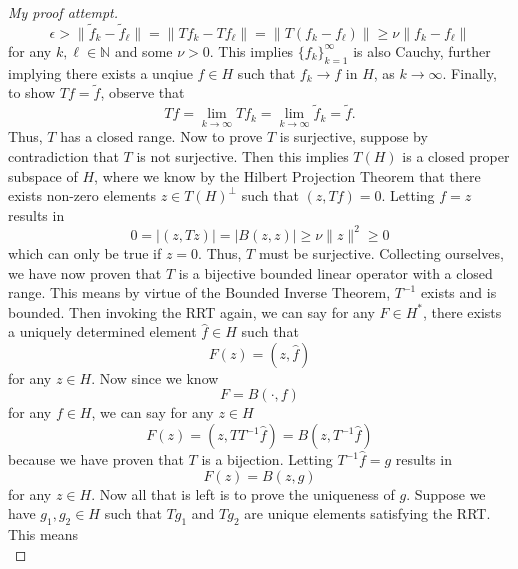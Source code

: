 \documentclass[11pt]{article}
\theoremstyle{definition}
\begin{document}
\begin{proof}[My proof attempt]
	\begin{equation*}
		\epsilon > \|\tilde{f}_k - \tilde{f}_{\ell}\| = \|Tf_k - Tf_{\ell}\| = \|T(f_k - f_{\ell})\| \geq \nu \|f_k - f_{\ell}\|
	\end{equation*}
	for any $k,\ell \in \mathbb{N}$ and some $\nu >0$.
	This implies $\{f_k\}_{k=1}^{\infty}$ is also Cauchy, further implying there exists a unqiue $f \in H$ such that
	$f_k \rightarrow f$ in $H$, as $k \rightarrow \infty$.
	Finally, to show $Tf = \tilde{f}$, observe that
	\begin{equation*}
		Tf = \lim_{k\rightarrow \infty}{Tf_k} = \lim_{k\rightarrow \infty}{\tilde{f}_k} = \tilde{f}.
	\end{equation*}
	Thus, $T$ has a closed range. Now to prove $T$ is surjective, suppose by contradiction that $T$ is not surjective.
	Then this implies $T(H)$ is a closed proper subspace of $H$, where we know by the Hilbert Projection Theorem that
	there exists non-zero elements $z \in T(H)^{\bot}$ such that $(z,Tf) = 0$. Letting $f = z$ results in
	\begin{equation*}
		0 = |(z,Tz)| = |B(z,z)| \geq \nu \|z\|^2 \geq 0
	\end{equation*}
	which can only be true if $z = 0$. Thus, $T$ must be surjective.
	Collecting ourselves, we have now proven that $T$ is a bijective bounded linear operator with a closed range.
	This means by virtue of the Bounded Inverse Theorem, $T^{-1}$ exists and is bounded.
	Then invoking the RRT again, we can say for any $F \in H^*$, there exists a uniquely determined element $\hat{f} \in H$ such that
	\begin{equation*}
		F(z) = (z,\hat{f})
	\end{equation*}
	for any $z \in H$. Now since we know
	\begin{equation*}
		F = B(\cdot,f)
	\end{equation*}
	for any $f \in H$, we can say for any $z \in H$
	\begin{equation*}
		F(z) = (z, TT^{-1}\hat{f}) = B(z,T^{-1}\hat{f})
	\end{equation*}
	because we have proven that $T$ is a bijection. Letting $T^{-1}\hat{f} = g$ results in
	\begin{equation*}
		F(z) = B(z,g)
	\end{equation*}
	for any $z \in H$. Now all that is left is to prove the uniqueness of $g$.
	Suppose we have $g_1,g_2 \in H$ such that $Tg_1$ and $Tg_2$ are unique elements satisfying
	the RRT. This means
	\begin{equation*}

\end{equation*}
\end{proof}
\end{document}
